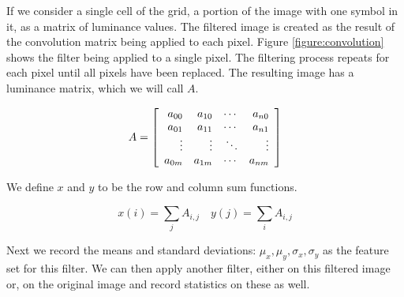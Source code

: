 If we consider a single cell of the grid, a portion of the image with one
symbol in it, as a matrix of luminance values. The filtered image is created as
the result of the convolution matrix being applied to each pixel. Figure
\ref{figure:convolution} shows the filter being applied to a single pixel. The
filtering process repeats for each pixel until all pixels have been replaced.
The resulting image has a luminance matrix, which we will call $A$.

\[A = \left [
    \begin{array}{r r r r}
        a_{00} & a_{10} & \cdots & a_{n0} \\
        a_{01} & a_{11} & \cdots & a_{n1}\\
        \vdots  & \vdots  & \ddots & \vdots\\
        a_{0m} & a_{1m} & \cdots & a_{nm}\\
    \end{array}
\right ] \]

We define $x$ and $y$ to be the row and column sum functions.

\begin{equation}
x(i) = \sum_{j}{A_{i,j}} \quad
y(j) = \sum_{i}{A_{i,j}}
\end{equation}

Next we record the means and standard deviations: $\mu_x, \mu_y, \sigma_x,
\sigma_y$ as the feature set for this filter.  We can then apply another
filter, either on this filtered image or, on the original image and record
statistics on these as well.

